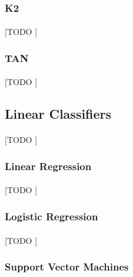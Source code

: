 \documentclass{article}
\begin{document}
			\subsubsection{K2}
			\label{sec:k2-bayes}

				\paragraph{}
				[TODO ]

			\subsubsection{TAN}
			\label{sec:tan-bayes}

				\paragraph{}
				[TODO ]

		\subsection{Linear Classifiers}
		\label{sec:decision-trees}

			\paragraph{}
			[TODO ]

			\subsubsection{Linear Regression}
			\label{sec:linear-regression}

				\paragraph{}
				[TODO ]

			\subsubsection{Logistic Regression}
			\label{sec:logistic-regression}

				\paragraph{}
				[TODO ]

			\subsubsection{Support Vector Machines}
			\label{sec:svm}
\end{document}
